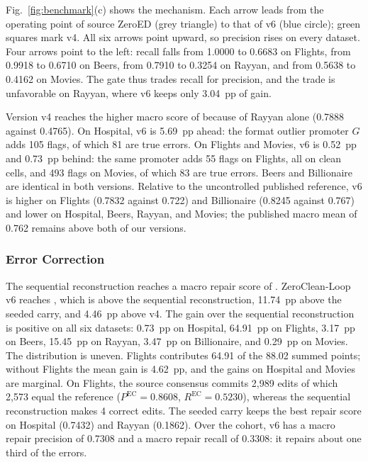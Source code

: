 \documentclass[conference]{IEEEtran}
\begin{document}
Fig.~\ref{fig:benchmark}(c) shows the mechanism. Each arrow leads from the operating point of source ZeroED (grey triangle) to that of v6 (blue circle); green squares mark v4. All six arrows point upward, so precision rises on every dataset. Four arrows point to the left: recall falls from 1.0000 to 0.6683 on Flights, from 0.9918 to 0.6710 on Beers, from 0.7910 to 0.3254 on Rayyan, and from 0.5638 to 0.4162 on Movies. The gate thus trades recall for precision, and the trade is unfavorable on Rayyan, where v6 keeps only 3.04~pp of gain.

Version v4 reaches the higher macro score of \VfourMacroED{} because of Rayyan alone (0.7888 against 0.4765). On Hospital, v6 is 5.69~pp ahead: the format outlier promoter $G$ adds 105 flags, of which 81 are true errors. On Flights and Movies, v6 is 0.52~pp and 0.73~pp behind: the same promoter adds 55 flags on Flights, all on clean cells, and 493 flags on Movies, of which 83 are true errors. Beers and Billionaire are identical in both versions. Relative to the uncontrolled published reference, v6 is higher on Flights (0.7832 against 0.722) and Billionaire (0.8245 against 0.767) and lower on Hospital, Beers, Rayyan, and Movies; the published macro mean of 0.762 remains above both of our versions.

\subsubsection{Error Correction}
The sequential reconstruction reaches a macro repair score of \SeqMacroRepair{}. ZeroClean-Loop v6 reaches \VsixMacroRepair{}, which is \VsixRepairGain{} above the sequential reconstruction, 11.74~pp above the seeded carry, and 4.46~pp above v4. The gain over the sequential reconstruction is positive on all six datasets: 0.73~pp on Hospital, 64.91~pp on Flights, 3.17~pp on Beers, 15.45~pp on Rayyan, 3.47~pp on Billionaire, and 0.29~pp on Movies. The distribution is uneven. Flights contributes 64.91 of the 88.02 summed points; without Flights the mean gain is 4.62~pp, and the gains on Hospital and Movies are marginal. On Flights, the source consensus commits 2,989 edits of which 2,573 equal the reference ($P^{\mathrm{EC}} = 0.8608$, $R^{\mathrm{EC}} = 0.5230$), whereas the sequential reconstruction makes 4 correct edits. The seeded carry keeps the best repair score on Hospital (0.7432) and Rayyan (0.1862). Over the cohort, v6 has a macro repair precision of 0.7308 and a macro repair recall of 0.3308: it repairs about one third of the errors.
\end{document}
